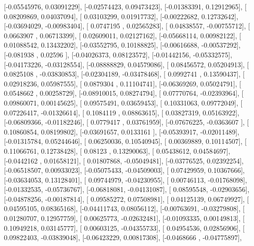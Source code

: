 \documentclass{article}
\begin{document}
       [-0.05545976,  0.03091229],
       [-0.02574423,  0.09473423],
       [-0.01383391,  0.12912965],
       [ 0.08209869,  0.04037094],
       [ 0.03103299,  0.01917732],
       [-0.00222682,  0.12732642],
       [-0.03694029, -0.00983404],
       [ 0.0747195 ,  0.02565283],
       [ 0.04838557, -0.00755712],
       [ 0.0663907 ,  0.06713399],
       [ 0.02609011,  0.02127162],
       [-0.05668114,  0.00982122],
       [ 0.01088542,  0.13432202],
       [-0.03552795,  0.10188825],
       [-0.00616688, -0.00537292],
       [-0.081938  ,  0.02596   ],
       [-0.04026373,  0.08123572],
       [-0.01442156, -0.05332575],
       [-0.04173226, -0.03128554],
       [-0.08888829,  0.04579086],
       [ 0.08456572,  0.05204913],
       [ 0.0825108 , -0.03830853],
       [-0.02304189, -0.03478468],
       [ 0.0992741 ,  0.13590437],
       [ 0.02918236,  0.05987555],
       [ 0.0879304 ,  0.11104741],
       [-0.06369269,  0.05024791],
       [ 0.0548662 ,  0.00258729],
       [-0.08910015,  0.08274794],
       [ 0.07770764, -0.02393964],
       [ 0.09860071,  0.00145625],
       [ 0.09575491,  0.03659453],
       [ 0.10331063,  0.09772049],
       [ 0.07226417, -0.01326614],
       [ 0.1084119 ,  0.08863615],
       [ 0.03827319,  0.05163922],
       [-0.06809366, -0.01182246],
       [ 0.0779417 ,  0.03761959],
       [-0.07676225, -0.0363607 ],
       [ 0.10860854,  0.08199802],
       [-0.03691657,  0.0133161 ],
       [-0.05393917, -0.02011489],
       [-0.01315784,  0.05244646],
       [ 0.06250036,  0.10540945],
       [ 0.00369889,  0.10114507],
       [ 0.11066761,  0.12738428],
       [ 0.08123   ,  0.13290063],
       [ 0.05438612,  0.04584697],
       [-0.0442162 ,  0.01658121],
       [ 0.01807868, -0.05049481],
       [-0.03776525,  0.02392254],
       [-0.06518507,  0.00933023],
       [-0.05075433, -0.04509003],
       [ 0.07429959,  0.10367666],
       [-0.03634053,  0.13128401],
       [ 0.09744979, -0.04230955],
       [ 0.00746113, -0.01768098],
       [-0.01332535, -0.05736767],
       [-0.06818081, -0.04131087],
       [ 0.08595548, -0.02903656],
       [-0.04878256, -0.00187814],
       [ 0.09585272,  0.07508981],
       [ 0.04125139,  0.06749927],
       [ 0.04595105,  0.08365168],
       [-0.04411743,  0.08056112],
       [-0.00763691, -0.03279808],
       [ 0.01280707,  0.12957759],
       [ 0.00625773, -0.02632481],
       [-0.01093335,  0.00149813],
       [ 0.10949218,  0.03145777],
       [ 0.00603125, -0.04355733],
       [ 0.04954536,  0.02856906],
       [ 0.09822403, -0.03839048],
       [-0.06423229,  0.00817308],
       [-0.0468666 , -0.04775897],
\end{document}
